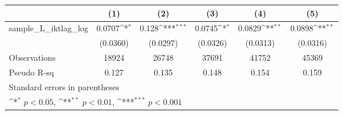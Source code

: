 {
\def\sym#1{\ifmmode^{#1}\else\(^{#1}\)\fi}
\begin{tabular}{l*{5}{c}}
\hline\hline
                &\multicolumn{1}{c}{(1)}         &\multicolumn{1}{c}{(2)}         &\multicolumn{1}{c}{(3)}         &\multicolumn{1}{c}{(4)}         &\multicolumn{1}{c}{(5)}         \\
\hline
sample\_L\_iktlag\_log&   0.0707\sym{*}  &    0.128\sym{***}&   0.0745\sym{*}  &   0.0829\sym{**} &   0.0898\sym{**} \\
                & (0.0360)         & (0.0297)         & (0.0326)         & (0.0313)         & (0.0316)         \\
\hline
Observations    &    18924         &    26748         &    37691         &    41752         &    45369         \\
Pseudo R-sq     &    0.127         &    0.135         &    0.148         &    0.154         &    0.159         \\
\hline\hline
\multicolumn{6}{l}{\footnotesize Standard errors in parentheses}\\
\multicolumn{6}{l}{\footnotesize \sym{*} \(p<0.05\), \sym{**} \(p<0.01\), \sym{***} \(p<0.001\)}\\
\end{tabular}
}
